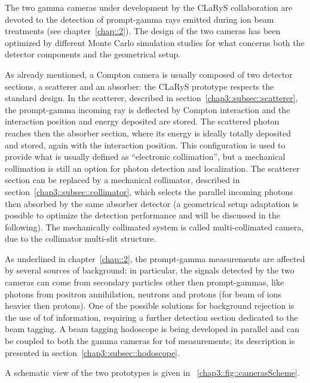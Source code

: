 The two gamma cameras under development by the CLaRyS collaboration are devoted to the detection of prompt-gamma rays emitted during ion beam treatments (see chapter~\ref{chap::2}). The design of the two cameras has been optimized by different Monte Carlo simulation studies for what concerns both the detector components and the geometrical setup.

As already mentioned, a Compton camera is usually composed of two detector sections, a scatterer and an absorber: the CLaRyS prototype respects the standard design. In the scatterer, described in section~\ref{chap3::subsec::scatterer}, the prompt-gamma incoming ray is deflected by Compton interaction and the interaction position and energy deposited are stored. The scattered photon reaches then the absorber section, where its energy is ideally totally deposited and stored, again with the interaction position. This configuration is used to provide what is usually defined as \enquote{electronic collimation}, but a mechanical collimation is still an option for photon detection and localization. The scatterer section can be replaced by a mechanical collimator, described in section~\ref{chap3::subsec::collimator}, which selects the parallel incoming photons then absorbed by the same absorber detector (a geometrical setup adaptation is possible to optimize the detection performance and will be discussed in the following). The mechanically collimated system is called multi-collimated camera, due to the collimator multi-slit structure.

As underlined in chapter~\ref{chap::2}, the prompt-gamma measurements are affected by several sources of background: in particular, the signals detected by the two cameras can come from secondary particles other then prompt-gammas, like photons from positron annihilation, neutrons and protons (for beam of ions heavier then protons). One of the possible solutions for background rejection is the use of \gls{tof} information, requiring a further detection section dedicated to the beam tagging. A beam tagging hodoscope is being developed in parallel and can be coupled to both the gamma cameras for \gls{tof} measurements; its description is presented in section~\ref{chap3::subsec::hodoscope}.

A schematic view of the two prototypes is given in \figurename~\ref{chap3::fig::camerasScheme}.

